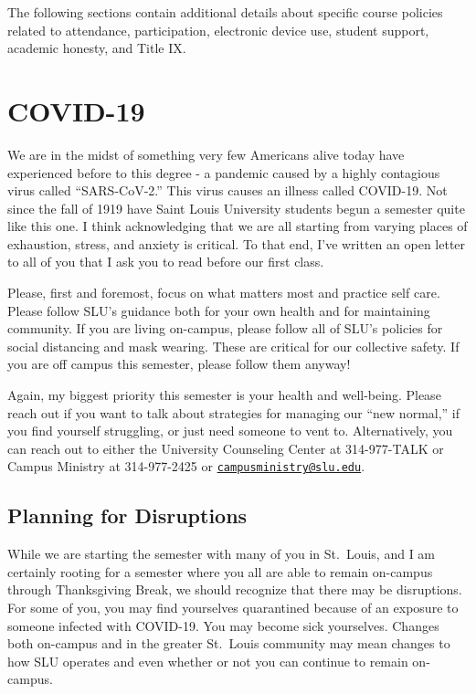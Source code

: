 \documentclass[
]{book}
\begin{document}
The following sections contain additional details about specific course policies related to attendance, participation, electronic device use, student support, academic honesty, and Title IX.

\hypertarget{covid-19}{%
\section{COVID-19}\label{covid-19}}

We are in the midst of something very few Americans alive today have experienced before to this degree - a pandemic caused by a highly contagious virus called ``SARS-CoV-2.'' This virus causes an illness called COVID-19. Not since the fall of 1919 have Saint Louis University students begun a semester quite like this one. I think acknowledging that we are all starting from varying places of exhaustion, stress, and anxiety is critical. To that end, I've written an open letter to all of you that I ask you to read before our first class.

Please, first and foremost, focus on what matters most and practice self care. Please follow SLU's guidance both for your own health and for maintaining community. If you are living on-campus, please follow all of SLU's policies for social distancing and mask wearing. These are critical for our collective safety. If you are off campus this semester, please follow them anyway!

Again, my biggest priority this semester is your health and well-being. Please reach out if you want to talk about strategies for managing our ``new normal,'' if you find yourself struggling, or just need someone to vent to. Alternatively, you can reach out to either the University Counseling Center at 314-977-TALK or Campus Ministry at 314-977-2425 or \href{mailto:campusministry@slu.edu}{\nolinkurl{campusministry@slu.edu}}.

\hypertarget{planning-for-disruptions}{%
\subsection{Planning for Disruptions}\label{planning-for-disruptions}}

While we are starting the semester with many of you in St.~Louis, and I am certainly rooting for a semester where you all are able to remain on-campus through Thanksgiving Break, we should recognize that there may be disruptions. For some of you, you may find yourselves quarantined because of an exposure to someone infected with COVID-19. You may become sick yourselves. Changes both on-campus and in the greater St.~Louis community may mean changes to how SLU operates and even whether or not you can continue to remain on-campus.
\end{document}
